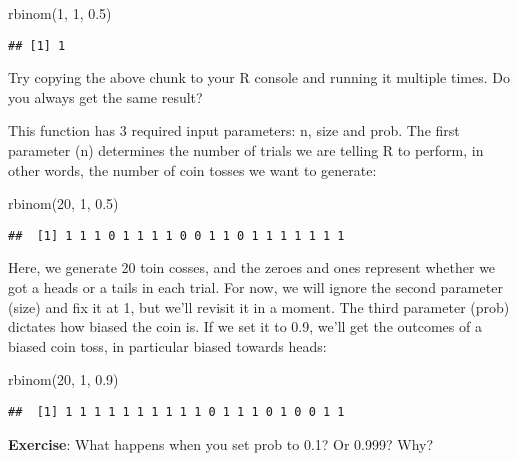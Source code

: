 \documentclass[
]{book}
\newenvironment{Shaded}{\begin{snugshade}}{\end{snugshade}}
\newcommand{\DecValTok}[1]{\textcolor[rgb]{0.00,0.00,0.81}{#1}}
\newcommand{\FloatTok}[1]{\textcolor[rgb]{0.00,0.00,0.81}{#1}}
\newcommand{\FunctionTok}[1]{\textcolor[rgb]{0.00,0.00,0.00}{#1}}
\newcommand{\NormalTok}[1]{#1}
\begin{document}
\begin{Shaded}
\begin{Highlighting}[]
\FunctionTok{rbinom}\NormalTok{(}\DecValTok{1}\NormalTok{, }\DecValTok{1}\NormalTok{, }\FloatTok{0.5}\NormalTok{)}
\end{Highlighting}
\end{Shaded}

\begin{verbatim}
## [1] 1
\end{verbatim}

Try copying the above chunk to your R console and running it multiple times. Do you always get the same result?

This function has 3 required input parameters: n, size and prob. The first parameter (n) determines the number of trials we are telling R to perform, in other words, the number of coin tosses we want to generate:

\begin{Shaded}
\begin{Highlighting}[]
\FunctionTok{rbinom}\NormalTok{(}\DecValTok{20}\NormalTok{, }\DecValTok{1}\NormalTok{, }\FloatTok{0.5}\NormalTok{)}
\end{Highlighting}
\end{Shaded}

\begin{verbatim}
##  [1] 1 1 1 0 1 1 1 1 0 0 1 1 0 1 1 1 1 1 1 1
\end{verbatim}

Here, we generate 20 toin cosses, and the zeroes and ones represent whether we got a heads or a tails in each trial. For now, we will ignore the second parameter (size) and fix it at 1, but we'll revisit it in a moment. The third parameter (prob) dictates how biased the coin is. If we set it to 0.9, we'll get the outcomes of a biased coin toss, in particular biased towards heads:

\begin{Shaded}
\begin{Highlighting}[]
\FunctionTok{rbinom}\NormalTok{(}\DecValTok{20}\NormalTok{, }\DecValTok{1}\NormalTok{, }\FloatTok{0.9}\NormalTok{)}
\end{Highlighting}
\end{Shaded}

\begin{verbatim}
##  [1] 1 1 1 1 1 1 1 1 1 1 0 1 1 1 0 1 0 0 1 1
\end{verbatim}

\textbf{Exercise}: What happens when you set prob to 0.1? Or 0.999? Why?
\end{document}
